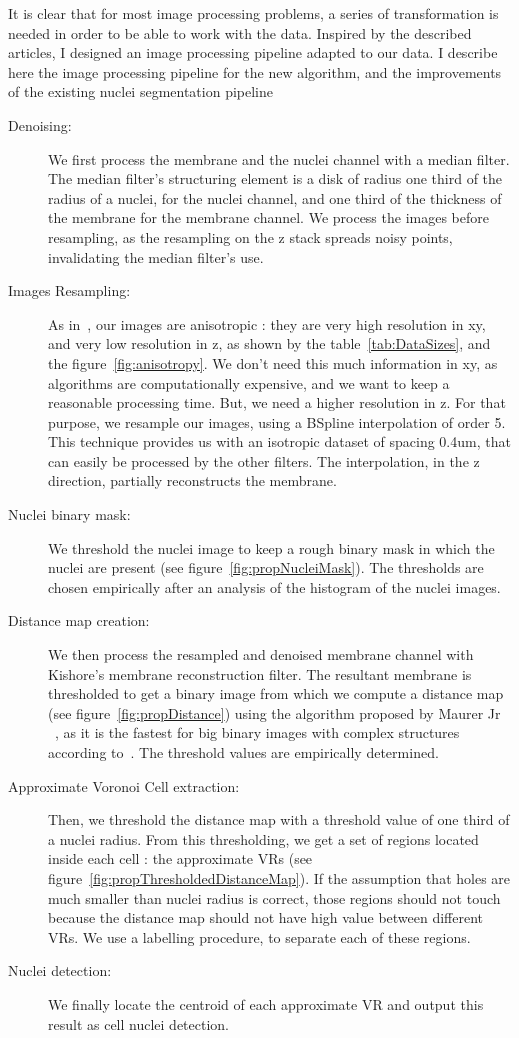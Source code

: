 It is clear that for most image processing problems, a series of transformation is needed in order to be able to work with the data.
Inspired by the described articles, I designed an image processing pipeline adapted to our data.
I describe here the image processing pipeline for the new algorithm, and the improvements of the existing nuclei segmentation pipeline
\begin{description}
  \item[Denoising: ] We first process the membrane and the nuclei channel with a median filter. The median filter's structuring element is a disk of radius one third of the radius of a nuclei, for the nuclei channel, and one third of the thickness of the membrane for the membrane channel.
  We process the images before resampling, as the resampling on the z stack spreads noisy points, invalidating the median filter's use.
%
%
  \item[Images Resampling: ] As in~\cite{li20073}, our images are anisotropic : they are very high resolution in xy, and very low resolution in z, as shown by the
  table~\ref{tab:DataSizes}, and the figure~\ref{fig:anisotropy}.
  We don't need this much information in xy, as algorithms are computationally expensive, and we want to keep a reasonable processing time.
  But, we need a higher resolution in z.
  For that purpose, we resample our images, using a BSpline interpolation of order 5.
  This technique provides us with an isotropic dataset of spacing 0.4um, that can easily be
  processed by the other filters. The interpolation, in the z direction, partially reconstructs the membrane.
%
%
  \item[Nuclei binary mask: ] We threshold the nuclei image to keep a rough binary mask in which the nuclei are present (see figure~\ref{fig:propNucleiMask}).
  The thresholds are chosen empirically after an analysis of the histogram of the nuclei images.
%  
%
%  
  \item[Distance map creation: ] We then process the resampled and denoised membrane channel with Kishore's membrane reconstruction filter.
  The resultant membrane is thresholded to get a binary image from which we compute a distance map (see figure~\ref{fig:propDistance})
  using the algorithm proposed by Maurer Jr {\etal}~\cite{maurer2003linear}, as it is the fastest for big binary images with complex structures according to~\cite{distanceMapReview}.
  The threshold values are empirically determined.
%  
%
%
  \item[Approximate Voronoi Cell extraction: ] Then, we threshold the distance map with a threshold value of one third of a nuclei radius.
  From this thresholding, we get a set of regions located inside each cell : the approximate VRs (see figure~\ref{fig:propThresholdedDistanceMap}).
  If the assumption that holes are much smaller than nuclei radius is correct, those regions should not touch because the distance map should not have high value between different VRs. We use a labelling procedure, to separate each of these regions.
%
%
  \item[Nuclei detection: ] We finally locate the centroid of each approximate VR and output this result as cell nuclei detection.
%  
%
%
\end{description}


